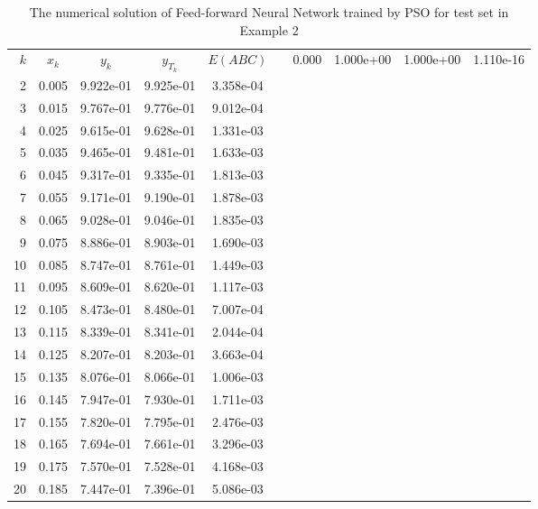 \begin{table}[ht]
  \caption{The numerical solution of Feed-forward Neural Network trained by PSO for test set in Example 2}
  \centering
  \begin{tabular}{rcccccc}
    $k$ & $x_{k}$ & $y_{k}$ & $y_{T_{k}}$ & $E(ABC)$ &     \hline{} &  0.000 &       1.000e+00 &       1.000e+00  &        1.110e-16\\ 
     2 &  0.005 &       9.922e-01 &       9.925e-01  &        3.358e-04\\ 
     3 &  0.015 &       9.767e-01 &       9.776e-01  &        9.012e-04\\ 
     4 &  0.025 &       9.615e-01 &       9.628e-01  &        1.331e-03\\ 
     5 &  0.035 &       9.465e-01 &       9.481e-01  &        1.633e-03\\ 
     6 &  0.045 &       9.317e-01 &       9.335e-01  &        1.813e-03\\ 
     7 &  0.055 &       9.171e-01 &       9.190e-01  &        1.878e-03\\ 
     8 &  0.065 &       9.028e-01 &       9.046e-01  &        1.835e-03\\ 
     9 &  0.075 &       8.886e-01 &       8.903e-01  &        1.690e-03\\ 
    10 &  0.085 &       8.747e-01 &       8.761e-01  &        1.449e-03\\ 
    11 &  0.095 &       8.609e-01 &       8.620e-01  &        1.117e-03\\ 
    12 &  0.105 &       8.473e-01 &       8.480e-01  &        7.007e-04\\ 
    13 &  0.115 &       8.339e-01 &       8.341e-01  &        2.044e-04\\ 
    14 &  0.125 &       8.207e-01 &       8.203e-01  &        3.663e-04\\ 
    15 &  0.135 &       8.076e-01 &       8.066e-01  &        1.006e-03\\ 
    16 &  0.145 &       7.947e-01 &       7.930e-01  &        1.711e-03\\ 
    17 &  0.155 &       7.820e-01 &       7.795e-01  &        2.476e-03\\ 
    18 &  0.165 &       7.694e-01 &       7.661e-01  &        3.296e-03\\ 
    19 &  0.175 &       7.570e-01 &       7.528e-01  &        4.168e-03\\ 
    20 &  0.185 &       7.447e-01 &       7.396e-01  &        5.086e-03\\ 

\end{tabular}
\end{table}
